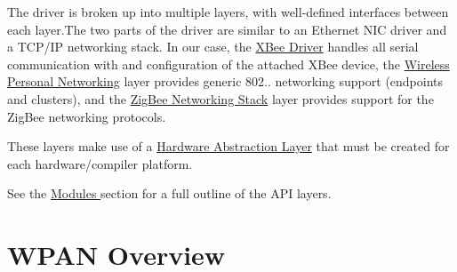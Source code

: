 The driver is broken up into multiple layers, with well-\/defined interfaces between each layer.\+The two parts of the driver are similar to an Ethernet N\+IC driver and a T\+C\+P/\+IP networking stack. In our case, the \hyperlink{group__xbee}{X\+Bee Driver} handles all serial communication with and configuration of the attached X\+Bee device, the \hyperlink{group__wpan}{Wireless Personal Networking} layer provides generic 802.. networking support (endpoints and clusters), and the \hyperlink{group__zigbee}{Zig\+Bee Networking Stack} layer provides support for the Zig\+Bee networking protocols.

These layers make use of a \hyperlink{group__hal}{Hardware Abstraction Layer} that must be created for each hardware/compiler platform.

See the \hyperlink{}{Modules } section for a full outline of the A\+PI layers.\hypertarget{index_wpan_overview}{}\section{W\+P\+A\+N Overview}\label{index_wpan_overview}
